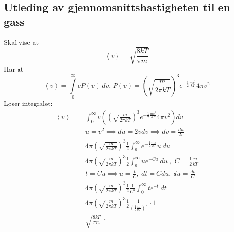 \documentclass[reprint,english,notitlepage]{revtex4-1}
\begin{document}
	\subsection{Utleding av gjennomsnittshastigheten til en gass}\label{avgSpeed}
	Skal vise at
	$$\left<v\right> = \sqrt{\frac{8kT}{\pi m}}$$
	Har at
	$$\left<v\right> = \int\limits_0^{\infty}vP(v)\ dv \text{, } P(v) = \left(\sqrt{\frac{m}{2\pi k T}}\right)^3 e^{-\frac{1}{2}\frac{m v^2}{k T}}4\pi v^2$$
	Løser integralet:
	\begin{align*}
		\left<v\right> &= \int_0^{\infty}v \left( \left(\sqrt{\frac{m}{2\pi k T}}\right)^3 e^{-\frac{1}{2}\frac{m v^2}{k T}}4\pi v^2 \right) dv \\
		&\ \ \ \ \ \ u = v^2 \implies du = 2vdv \implies dv = \frac{du}{2v} \\
		&= 4\pi \left(\sqrt{\frac{m}{2\pi k T}}\right)^3 \frac{1}{2} \int_0^{\infty} e^{-\frac{1}{2}\frac{m u}{k T}} u\ du \\
		&= 4\pi \left(\sqrt{\frac{m}{2\pi k T}}\right)^3 \frac{1}{2}\int_0^{\infty} ue^{-Cu}\ du\ \text{, }\ C = \frac{1}{2}\frac{m}{k T} \\
		&\ \ \ \ \ \ t = Cu \implies u = \frac{t}{C},\ dt = Cdu,\ du = \frac{dt}{C} \\
		&= 4\pi \left(\sqrt{\frac{m}{2\pi k T}}\right)^3 \frac{1}{2} \frac{1}{C^2}\int_0^{\infty} te^{-t}\ dt \\
		&= 4\pi \left(\sqrt{\frac{m}{2\pi k T}}\right)^3 \frac{1}{2} \frac{1}{\left(\frac{1}{2}\frac{m}{k T}\right)^2} \cdot 1 \\
		&=\sqrt{\frac{8kT}{\pi m}} \ \ \square
	\end{align*}
\end{document}
